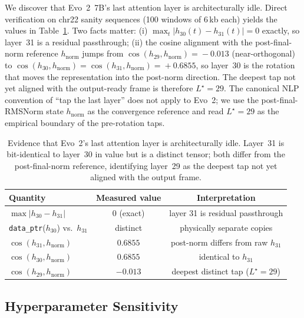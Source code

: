 \documentclass{article}
\theoremstyle{plain}
\theoremstyle{definition}
\theoremstyle{remark}
\newcommand{\hnorm}{h_{\mathrm{norm}}}
\begin{document}
We discover that Evo~2~7B's last attention layer is architecturally
idle. Direct verification on chr22 sanity sequences (100 windows of
6\,kb each) yields the values in Table~\ref{tab:idle-block}. Two facts
matter: (i) $\max_t |h_{30}(t)\!-\!h_{31}(t)|\!=\!0$ exactly, so layer~31
is a residual passthrough; (ii) the cosine alignment with the
post-final-norm reference $\hnorm$ jumps from $\cos(h_{29},\hnorm)\!=\!{-}0.013$
(near-orthogonal) to $\cos(h_{30},\hnorm)\!=\!\cos(h_{31},\hnorm)\!=\!{+}0.6855$,
so layer~30 is the rotation that moves the representation into the
post-norm direction. The deepest tap not yet aligned with
the output-ready frame is therefore $L^{\star}=29$. The canonical NLP
convention of ``tap the last layer'' does not apply to Evo~2; we use
the post-final-RMSNorm state $\hnorm$ as the convergence reference and
read $L^{\star}=29$ as the empirical boundary of the pre-rotation taps.

\begin{table}[!htbp]
  \caption{Evidence that Evo~2's last attention layer is architecturally
    idle. Layer~31 is bit-identical to layer~30 in value but is a distinct
    tensor; both differ from the post-final-norm reference, identifying
  layer~29 as the deepest tap not yet aligned with the output frame.}
  \label{tab:idle-block}
  \centering
  \small
  \begin{tabular}{@{}lcc@{}}
    \toprule
    Quantity & Measured value & Interpretation \\
    \midrule
    $\max\bigl|h_{30}-h_{31}\bigr|$ & $0$ (exact) &
    layer 31 is residual passthrough \\
    \texttt{data\_ptr}($h_{30}$) vs.\ $h_{31}$ & distinct &
    physically separate copies \\
    $\cos(h_{31}, \hnorm)$ & $0.6855$ &
    post-norm differs from raw $h_{31}$ \\
    $\cos(h_{30}, \hnorm)$ & $0.6855$ &
    identical to $h_{31}$ \\
    $\cos(h_{29}, \hnorm)$ & $-0.013$ &
    deepest distinct tap ($L^{\star}=29$) \\
    \bottomrule
  \end{tabular}
\end{table}

\subsection{Hyperparameter Sensitivity}
\label{app:gamma-sweep}
\end{document}
